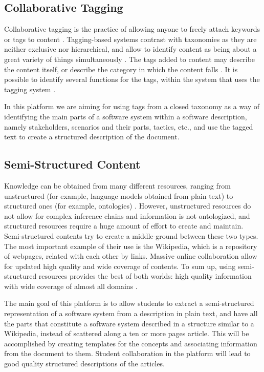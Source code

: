 \documentclass{llncs}
\begin{document}
\subsection{Collaborative Tagging}
Collaborative tagging is the practice of allowing anyone to freely attach keywords or tags to content \cite{golder2006usage}. Tagging-based systems contrast with taxonomies as they are neither exclusive nor hierarchical, and allow to identify content as being about a great variety of things simultaneously \cite{golder2006usage}. The tags added to content may describe the content itself, or describe the category in which the content falls \cite{coates2005two}. It is possible to identify several functions for the tags, within the system that uses the tagging system \cite{golder2006usage}.

In this platform we are aiming for using tags from a closed taxonomy as a way of identifying the main parts of a software system within a software description, namely stakeholders, scenarios and their parts, tactics, etc., and use the tagged text to create a structured description of the document.

\subsection{Semi-Structured Content}
Knowledge can be obtained from many different resources, ranging from unstructured (for example, language models obtained from plain text) to structured ones (for example, ontologies) \cite{hovy2013collaboratively}. However, unstructured resources do not allow for complex inference chains\cite{domingos2007toward} and information is not ontologized\cite{hovy2013collaboratively}, and structured resources require a huge amount of effort to create and maintain\cite{hovy2013collaboratively}. Semi-structured contents try to create a middle-ground between these two types. The most important example of their use is the Wikipedia, which is a repository of webpages, related with each other by links. Massive online collaboration allow for updated high quality and wide coverage of contents. To sum up, using semi-structured resources provides the best of both worlds: high quality information with wide coverage of almost all domains \cite{hovy2013collaboratively}.
 
The main goal of this platform is to allow students to extract a semi-structured representation of a software system from a description in plain text, and have all the parts that constitute a software system described in a structure similar to a Wikipedia, instead of scattered along a ten or more pages article. This will be accomplished by creating templates for the concepts and associating information from the document to them. Student collaboration in the platform will lead to good quality structured descriptions of the articles.
	
\end{document}
